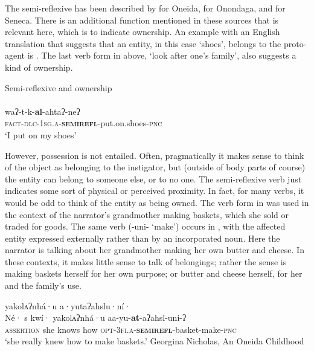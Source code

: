 \documentclass[output=paper]{langscibook}
\begin{document}
          

   

The semi-reflexive has been described by \citet[74]{Lounsbury1953} for Oneida, \citet[237--243]{Woodbury2018} for Onondaga, and \citet[55--58]{Chafe2015} for Seneca. There is an additional function mentioned in these sources that is relevant here, which is to indicate ownership. An example with an English translation that suggests that an entity, in this case ‘shoes’, belongs to the proto-agent is . The last verb form in  above, ‘look after one’s family’, also suggests a kind of ownership.

\ea%
    \label{ex:oneida:23}
    Semi-reflexive and ownership\\
   \\
    waʔ-t-k-\textbf{al}-ahtaʔ-neʔ\\
  \textsc{fact-dlc-1sg.a-}\textbf{\textsc{semirefl}}\textsc{-}put.on.shoes\textsc{-pnc} \\
 \glt ‘I put on my shoes’
\z
    
However, possession is not entailed. Often, pragmatically it makes sense to think of the object as belonging to the instigator, but (outside of body parts of course) the entity can belong to someone else, or to no one. The semi-reflexive verb just indicates some sort of physical or perceived proximity. In fact, for many verbs, it would be odd to think of the entity as being owned. The verb form in  was used in the context of the narrator’s grandmother making baskets, which she sold or traded for goods. The same verb ({{}-uni-} ‘make’) occurs in , with the affected entity expressed externally rather than by an incorporated noun. Here the narrator is talking about her grandmother making her own butter and cheese. In these contexts, it makes little sense to talk of belongings; rather the sense is making baskets herself for her own purpose; or butter and cheese herself, for her and the family’s use.

\ea%
    \label{ex:oneida:24}
     {yakolʌʔnhá·u}    {a·yutaʔahslu·ní·}\\
   {{Né·} {s} {kwí·}} {yakolʌʔnhá·u}  aa-yu-\textbf{at}-aʔahsl-uni-ʔ\\
      \textsc{assertion} {she knows how}   \textsc{opt-3fi.a-}\textbf{\textsc{semirefl}}\textsc{-}basket-make\textsc{-pnc} \\
 \glt ‘she really knew how to make baskets.’ Georgina Nicholas, {An} {Oneida} {Childhood}
\z
  
\end{document}
